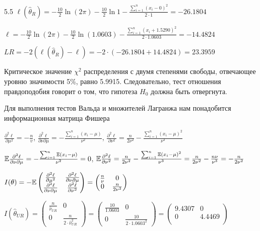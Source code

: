 \begin{solution}{{5.5}}
$\ell(\hat{\theta}_{R}) = -\frac{10}{2} \ln(2\pi) - \frac{10}{2} \ln 1 - \frac{\sum_{i=1}^n (x_i - 0)^2}{2 \cdot 1} = -26.1804$

$\ell = -\frac{10}{2} \ln(2\pi) -  \frac{10}{2} \ln (1.0603) - \frac{\sum_{i=1}^n (x_i + 1.5290)^2}{2 \cdot 1.0603} = -14.4824$

$LR = -2(\ell(\hat{\theta}_{R}) - \ell) = -2 \cdot (-26.1804 + 14.4824) = 23.3959$

Критическое значение $\chi^2$ распределения с двумя степенями свободы, отвечающее уровню значимости 5\%, равно 5.9915. Следовательно, тест отношения правдоподобия говорит о том, что гипотеза $H_0$ должна быть отвергнута.

Для выполнения тестов Вальда и множителей Лагранжа нам понадобится информационная матрица Фишера

$\frac{\partial^2 \ell}{\partial \mu^2} = -\frac{n}{v}$, $\frac{\partial^2 \ell}{\partial \nu \partial \mu} = -\frac{\sum_{i=1}^n (x_i - \mu)}{\nu^2}$, $\frac{\partial^2 \ell}{\partial \nu^2} = \frac{n}{2\nu^2} - \frac{\sum_{i=1}^n (x_i - \mu)^2}{\nu^3}$

$\mathbb{E} \frac{\partial^2 \ell}{\partial \nu \partial \mu} = -\frac{\sum_{i=1}^n \mathbb{E}(x_i - \mu)}{\nu^2} = 0$, $\mathbb{E} \frac{\partial^2 \ell}{\partial \nu^2} = \frac{n}{2\nu^2} - \frac{\sum_{i=1}^n \mathbb{E}(x_i - \mu)^2}{\nu^3} = \frac{n}{2\nu^2} - \frac{n\nu}{\nu^3} =- \frac{n}{2\nu^2}$

$I(\theta) = -\mathbb{E} \begin{pmatrix}
\frac{\partial^2 \ell}{\partial \mu^2} & \frac{\partial^2 \ell}{\partial \nu \partial \mu} \\
\frac{\partial^2 \ell}{\partial \nu \partial \mu} & \frac{\partial^2 \ell}{\partial \nu^2} \\
\end{pmatrix} = \begin{pmatrix}
\frac{n}{\nu} & 0 \\
0 & \frac{n}{2\nu^2}
\end{pmatrix}$

$I(\hat{\theta}_{UR}) = \begin{pmatrix}
\frac{n}{\hat{\nu}_{UR}} & 0 \\
0 & \frac{n}{2 \cdot \hat{\nu}_{UR}^2}
\end{pmatrix} = \begin{pmatrix}
\frac{10}{1.0603} & 0 \\
0 & \frac{10}{2 \cdot 1.0603^2}
\end{pmatrix} = \begin{pmatrix}
9.4307 & 0 \\
0 & 4.4469 \\
\end{pmatrix}$


\end{solution}
